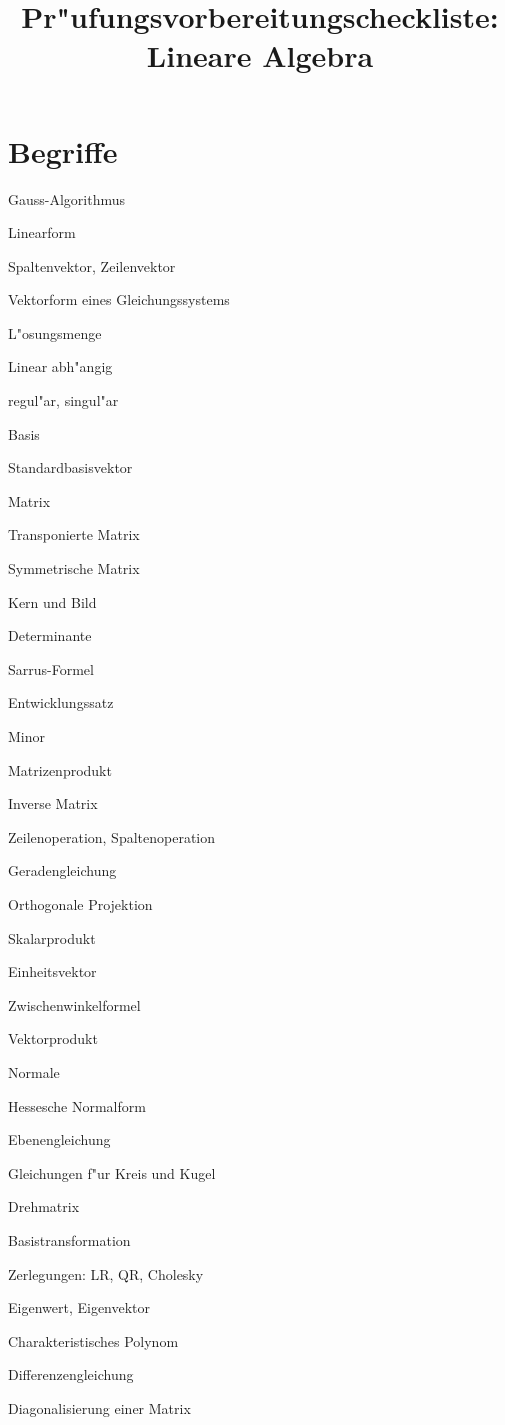 \documentclass[a4paper,12pt,twocolumn]{article}
\begin{document}
\title{Pr"ufungsvorbereitungscheckliste:\\ Lineare Algebra}
\date{}
\maketitle
\section{Begriffe}
\begin{compactenum}
\item Gauss-Algorithmus
\item Linearform
\item Spaltenvektor, Zeilenvektor
\item Vektorform eines Gleichungssystems
\item L"osungsmenge
\item Linear abh"angig
\item regul"ar, singul"ar
\item Basis
\item Standardbasisvektor
\item Matrix
\item Transponierte Matrix
\item Symmetrische Matrix
\item Kern und Bild
\item Determinante
\item Sarrus-Formel
\item Entwicklungssatz
\item Minor
\item Matrizenprodukt
\item Inverse Matrix
\item Zeilenoperation, Spaltenoperation
\item Geradengleichung
\item Orthogonale Projektion
\item Skalarprodukt
\item Einheitsvektor
\item Zwischenwinkelformel
\item Vektorprodukt
\item Normale
\item Hessesche Normalform
\item Ebenengleichung
\item Gleichungen f"ur Kreis und Kugel
\item Drehmatrix
\item Basistransformation
\item Zerlegungen: LR, QR, Cholesky
\item Eigenwert, Eigenvektor
\item Charakteristisches Polynom
\item Differenzengleichung
\item Diagonalisierung einer Matrix
\end{compactenum}
\vfill
\end{document}
